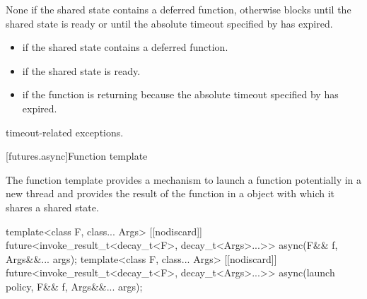 \begin{itemdescr}
\pnum
{}%
\effects
None if the shared state contains a deferred function,
otherwise
blocks until the shared state is ready or until the
absolute timeout specified by
 has expired.

\pnum
\returns
\begin{itemize}
\item {} if the shared state contains a deferred
function.

\item {} if the shared state is ready.

\item {} if the function is returning because the
absolute timeout
specified by  has expired.
\end{itemize}

\pnum
\throws
timeout-related exceptions.
\end{itemdescr}

[futures.async]{Function template }

\pnum
The function template  provides a mechanism to launch a function potentially
in a new thread and provides the result of the function in a  object with which
it shares a shared state.

%
\begin{itemdecl}
template<class F, class... Args>
  [[nodiscard]] future<invoke_result_t<decay_t<F>, decay_t<Args>...>>
    async(F&& f, Args&&... args);
template<class F, class... Args>
  [[nodiscard]] future<invoke_result_t<decay_t<F>, decay_t<Args>...>>
    async(launch policy, F&& f, Args&&... args);
\end{itemdecl}

